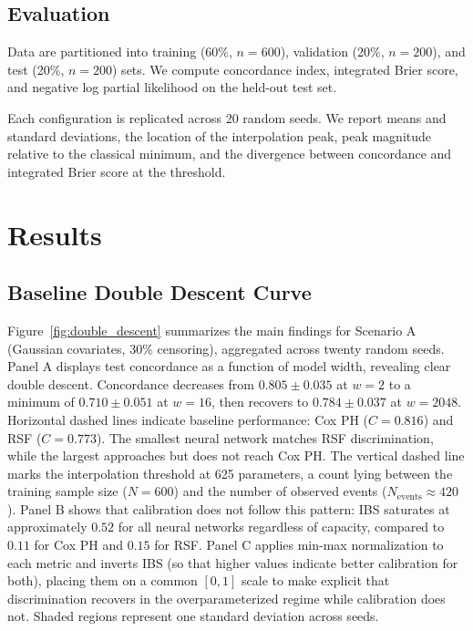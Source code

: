 \documentclass[12pt,a4paper]{article}
\begin{document}
\subsection{Evaluation}

Data are partitioned into training (60\%, $n=600$), validation (20\%, $n=200$), and test (20\%, $n=200$) sets. We compute concordance index, integrated Brier score, and negative log partial likelihood on the held-out test set.

Each configuration is replicated across 20 random seeds. We report means and standard deviations, the location of the interpolation peak, peak magnitude relative to the classical minimum, and the divergence between concordance and integrated Brier score at the threshold.

\section{Results}

\subsection{Baseline Double Descent Curve}

Figure~\ref{fig:double_descent} summarizes the main findings for Scenario A (Gaussian covariates, 30\% censoring), aggregated across twenty random seeds. Panel A displays test concordance as a function of model width, revealing clear double descent. Concordance decreases from $0.805 \pm 0.035$ at $w = 2$ to a minimum of $0.710 \pm 0.051$ at $w = 16$, then recovers to $0.784 \pm 0.037$ at $w = 2048$. Horizontal dashed lines indicate baseline performance: Cox PH ($C = 0.816$) and RSF ($C = 0.773$). The smallest neural network matches RSF discrimination, while the largest approaches but does not reach Cox PH. The vertical dashed line marks the interpolation threshold at 625 parameters, a count lying between the training sample size ($N = 600$) and the number of observed events ($N_{\text{events}} \approx 420$). Panel B shows that calibration does not follow this pattern: IBS saturates at approximately $0.52$ for all neural networks regardless of capacity, compared to $0.11$ for Cox PH and $0.15$ for RSF. Panel C applies min-max normalization to each metric and inverts IBS (so that higher values indicate better calibration for both), placing them on a common $[0, 1]$ scale to make explicit that discrimination recovers in the overparameterized regime while calibration does not. Shaded regions represent one standard deviation across seeds.
\end{document}
